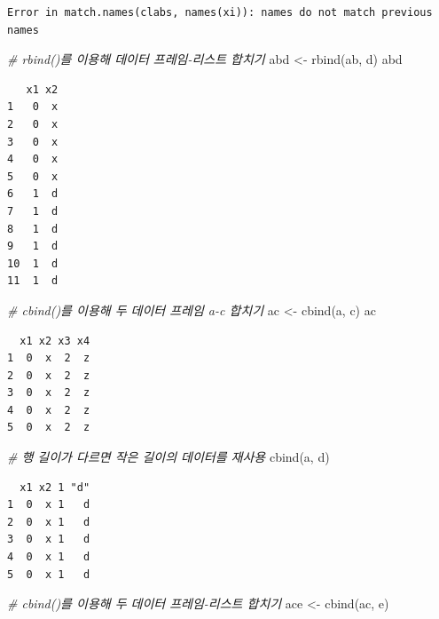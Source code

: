 \documentclass[
  11pt,
]{krantz}
\newenvironment{Shaded}{\begin{snugshade}}{\end{snugshade}}
\newcommand{\CommentTok}[1]{\textcolor[rgb]{0.37,0.37,0.37}{\textit{#1}}}
\newcommand{\FunctionTok}[1]{\textcolor[rgb]{0,0,0}{#1}}
\newcommand{\NormalTok}[1]{#1}
\newcommand{\OtherTok}[1]{\textcolor[rgb]{0.37,0.37,0.37}{#1}}
\begin{document}
\begin{verbatim}
Error in match.names(clabs, names(xi)): names do not match previous names
\end{verbatim}

\begin{Shaded}
\begin{Highlighting}[]
\CommentTok{\# rbind()를 이용해 데이터 프레임{-}리스트 합치기}
\NormalTok{abd }\OtherTok{\textless{}{-}} \FunctionTok{rbind}\NormalTok{(ab, d)}
\NormalTok{abd}
\end{Highlighting}
\end{Shaded}

\begin{verbatim}
   x1 x2
1   0  x
2   0  x
3   0  x
4   0  x
5   0  x
6   1  d
7   1  d
8   1  d
9   1  d
10  1  d
11  1  d
\end{verbatim}

\begin{Shaded}
\begin{Highlighting}[]
\CommentTok{\# cbind()를 이용해 두 데이터 프레임 a{-}c 합치기}
\NormalTok{ac }\OtherTok{\textless{}{-}} \FunctionTok{cbind}\NormalTok{(a, c)}
\NormalTok{ac}
\end{Highlighting}
\end{Shaded}

\begin{verbatim}
  x1 x2 x3 x4
1  0  x  2  z
2  0  x  2  z
3  0  x  2  z
4  0  x  2  z
5  0  x  2  z
\end{verbatim}

\begin{Shaded}
\begin{Highlighting}[]
\CommentTok{\# 행 길이가 다르면 작은 길이의 데이터를 재사용}
\FunctionTok{cbind}\NormalTok{(a, d)}
\end{Highlighting}
\end{Shaded}

\begin{verbatim}
  x1 x2 1 "d"
1  0  x 1   d
2  0  x 1   d
3  0  x 1   d
4  0  x 1   d
5  0  x 1   d
\end{verbatim}

\begin{Shaded}
\begin{Highlighting}[]
\CommentTok{\# cbind()를 이용해 두 데이터 프레임{-}리스트 합치기}
\NormalTok{ace }\OtherTok{\textless{}{-}} \FunctionTok{cbind}\NormalTok{(ac, e)}
\end{Highlighting}
\end{Shaded}
\end{document}
